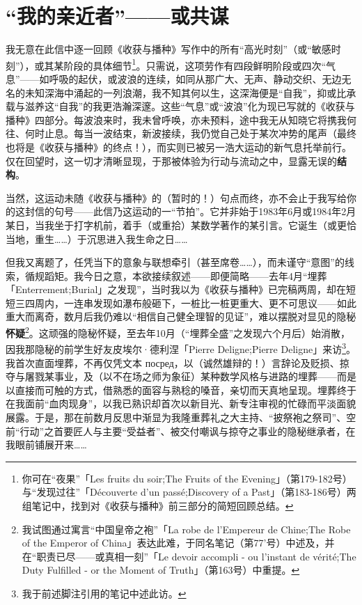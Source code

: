 \section{“我的亲近者”——或共谋}

我无意在此信中逐一回顾《收获与播种》写作中的所有“高光时刻”（或“敏感时刻”），或其某阶段的具体细节\footnote{你可在“夜果”「Les fruits du soir;The Fruits of the Evening」（第179-182号）与“发现过往”「Découverte d'un passé;Discovery of a Past」（第183-186号）两组笔记中，找到对《收获与播种》前三部分的简短回顾总结。}。只需说，这项劳作有四段鲜明阶段或四次“气息”——如呼吸的起伏，或波浪的连续，如同从那广大、无声、静动交织、无边无名的未知深海中涌起的一列浪潮，我不知其何以生，这深海便是“自我”，抑或比承载与滋养这“自我”的我更浩瀚深邃。这些“气息”或“波浪”化为现已写就的《收获与播种》四部分。每波浪来时，我未曾呼唤，亦未预料，途中我无从知晓它将携我何往、何时止息。每当一波结束，新波接续，我仍觉自己处于某次冲势的尾声（最终也将是《收获与播种》的终点！），而实则已被另一浩大运动的新气息托举前行。仅在回望时，这一切才清晰显现，于那被体验为行动与流动之中，显露无误的\textbf{结构}。

当然，这运动未随《收获与播种》的（暂时的！）句点而终，亦不会止于我写给你的这封信的句号——此信乃这运动的一“节拍”。它并非始于1983年6月或1984年2月某日，当我坐于打字机前，着手（或重拾）某数学著作的某引言。它诞生（或更恰当地，重生……）于沉思进入我生命之日……

但我又离题了，任凭当下的意象与联想牵引（甚至席卷……），而未谨守“意图”的线索，循规蹈矩。我今日之意，本欲接续叙述——即便简略——去年4月“埋葬「Enterrement;Burial」之发现”，当时我以为《收获与播种》已完稿两周，却在短短三四周内，一连串发现如瀑布般砸下，一桩比一桩更重大、更不可思议——如此重大而离奇，数月后我仍难以“相信自己健全理智的见证”，难以摆脱对显见的隐秘\textbf{怀疑}\footnote{我试图通过寓言“中国皇帝之袍”「La robe de l'Empereur de Chine;The Robe of the Emperor of China」表达此难，于同名笔记（第77'号）中述及，并在“职责已尽——或真相一刻”「Le devoir accompli - ou l'instant de vérité;The Duty Fulfilled - or the Moment of Truth」（第163号）中重提。}。这顽强的隐秘怀疑，至去年10月（“埋葬全盛”之发现六个月后）始消散，因我那隐秘的前学生好友皮埃尔·德利涅「Pierre Deligne;Pierre Deligne」来访\footnote{我于前述脚注引用的笔记中述此访。}。我首次直面埋葬，不再仅凭文本 посред，以（诚然雄辩的！）言辞论及贬损、掠夺与屠戮某事业，及（以不在场之师为象征）某种数学风格与进路的埋葬——而是以直接而可触的方式，借熟悉的面容与熟稔的嗓音，亲切而天真地呈现。埋葬终于在我面前“血肉现身”，以我已熟识却首次以新目光、新专注审视的忙碌而平淡面貌展露。于是，那在前数月反思中渐显为我隆重葬礼之大主持、“披祭袍之祭司”、空前“行动”之首要匠人与主要“受益者”、被交付嘲讽与掠夺之事业的隐秘继承者，在我眼前铺展开来……

